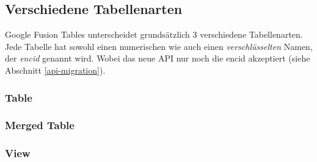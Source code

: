 \subsection{Verschiedene Tabellenarten}
Google Fusion Tables unterscheidet grundsätzlich 3 verschiedene Tabellenarten. Jede Tabelle hat sowohl einen numerischen wie auch einen \emph{verschlüsselten} Namen, der \emph{encid} genannt wird. Wobei das neue API nur noch die encid akzeptiert (siehe Abschnitt \ref{api-migration}). 

\subsubsection{Table}

\subsubsection{Merged Table}

\subsubsection{View}











